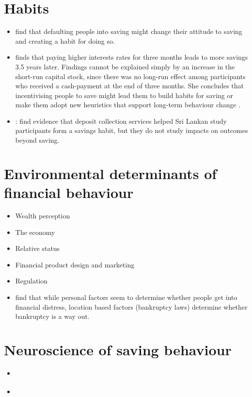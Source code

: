 \documentclass[a4paper, 11pt]{report}
\begin{document}
\section{Habits}
\begin{itemize}
	\item \citet{blumenstock2018defaults} find that defaulting people into saving might change their attitude to saving and creating a habit for doing so.

	\item \citet{schaner2018persistent} finds that paying higher interests rates for three months leads to more savings 3.5 years later. Findings cannot be explained simply by an increase in the short-run capital stock, since there was no long-run effect among participants who received a cash-payment at the end of three months. She concludes that incentivising people to save might lead them to build habits for saving \citep{becker1988theory} or make them adopt new heuristics that support long-term behaviour change \citep{thaler1999mental}.

	\item \citet{de2013deposit}: find evidence that deposit collection services helped Sri Lankan study participants form a savings habit, but they do not study impacts on outcomes beyond saving.
\end{itemize}

\section{Environmental determinants of financial behaviour}
\begin{itemize}
	\item Wealth perception \citep{greenberg2019financial}
	\item The economy \citep{greenberg2019financial}
	\item Relative status \citep{greenberg2019financial}
	\item Financial product design and marketing \citep{agarwal2017shapes}
	\item Regulation \citep{agarwal2017shapes}

	\item \citet{keys2020determines} find that while personal factors seem to determine whether people get into financial distress, location based factors (bankruptcy laws) determine whether bankruptcy is a way out.
\end{itemize}


\section{Neuroscience of saving behaviour}
\begin{itemize}
	\item \citet{schultz2006behavioral}
	\item \citet{zangemeister2016neural}
\end{itemize}
\end{document}
